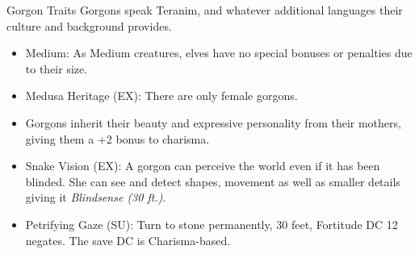 \begin{35e}{Gorgon Traits}
  Gorgons speak Teranim, and whatever additional languages their culture and
  background provides.

  \begin{itemize}[noitemsep]
    \item Medium: As Medium creatures, elves have no special bonuses or
      penalties due to their size.
    \item Medusa Heritage (EX): There are only female gorgons.
    \item Gorgons inherit their beauty and expressive personality from their
      mothers, giving them a +2 bonus to charisma.
    \item Snake Vision (EX): A gorgon can perceive the world even if it has
      been blinded. She can see and detect shapes, movement as well as smaller
      details giving it \emph{Blindsense (30 ft.)}.
    \item Petrifying Gaze (SU): Turn to stone permanently, 30 feet, Fortitude
      DC 12 negates. The save DC is Charisma-based.
  \end{itemize}
\end{35e}

